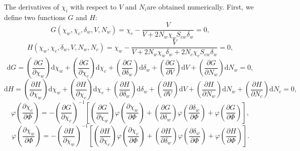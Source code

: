 The derivatives of $\chi_i$ with respect to $V$ and $N_i$are obtained numerically. First, we define two functions $G$ and $H$:
\begin{equation}
    G \left(\chi_w, \chi_c, \delta_w, V, N_w \right ) = \chi_c -  \frac{V}{V+2N_w\chi_w S_{cw}\delta_w} =0,
    \label{Gfunction}
\end{equation}
\begin{equation}
    H \left(\chi_w,  \chi_c, \delta_w, V, N_w, N_c \right ) = \chi_w -  \frac{V}{V+2N_w\chi_w\delta_w+2N_c\chi_cS_{cw}\delta_w}=0,
    \label{Hfunction}
\end{equation}
\begin{equation}
        \mathrm{d} G = \left ( \frac{\partial G}{\partial \chi_w} \right )\mathrm{d}\chi_w +\left ( \frac{\partial G}{\partial \chi_c} \right )\mathrm{d}\chi_c + \left ( \frac{\partial G}{\partial \delta_w} \right )\mathrm{d}\delta_w + \left ( \frac{\partial G}{\partial V} \right )\mathrm{d}V + \left ( \frac{\partial G}{\partial N_w} \right )\mathrm{d}N_w = 0,
        \label{Gfunction_derivative}
\end{equation} 
\begin{equation}
        \mathrm{d} H = \left ( \frac{\partial H}{\partial \chi_w} \right )\mathrm{d}\chi_w + \left ( \frac{\partial H}{\partial \chi_c} \right )\mathrm{d}\chi_c + \left ( \frac{\partial H}{\partial \delta_w} \right )\mathrm{d}\delta_w + \left ( \frac{\partial H}{\partial V} \right )\mathrm{d}V + \left ( \frac{\partial H}{\partial N_w} \right )\mathrm{d}N_w  + \left ( \frac{\partial H}{\partial N_c} \right )\mathrm{d}N_c = 0,
        \label{Hfunction_derivative}
\end{equation} 
\begin{equation}
        \varphi \left ( \frac{\partial \chi_c}{\partial \Phi} \right ) = -\left ( \frac{\partial G}{\partial \chi_c} \right )^{-1}\left [  \left ( \frac{\partial G}{\partial \chi_w} \right )\varphi\left ( \frac{\partial \chi_w}{\partial \Phi} \right ) + \left ( \frac{\partial G}{\partial \delta_w} \right )\varphi\left ( \frac{\partial \delta_w}{\partial \Phi} \right ) + \varphi\left ( \frac{\partial G}{\partial \Phi} \right ) \right ],
        \label{Gfunction_Phi}
\end{equation} 
\begin{equation}
        \varphi \left ( \frac{\partial \chi_w}{\partial \Phi} \right ) = -\left ( \frac{\partial H}{\partial \chi_w} \right )^{-1}\left [  \left ( \frac{\partial H}{\partial \chi_c} \right )\varphi\left ( \frac{\partial \chi_c}{\partial \Phi} \right ) + \left ( \frac{\partial H}{\partial \delta_w} \right )\varphi\left ( \frac{\partial \delta_w}{\partial \Phi} \right ) + \varphi\left ( \frac{\partial H}{\partial \Phi} \right ) \right ].
        \label{Hfunction_Phi}
\end{equation} 

